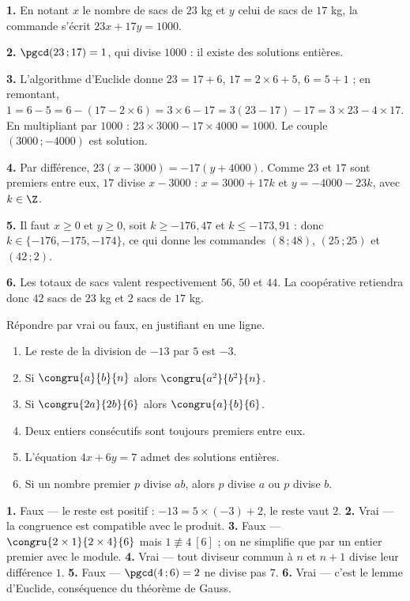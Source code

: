 \begin{corrige}
\textbf{1.} En notant $x$ le nombre de sacs de $23$ kg et $y$ celui de sacs de
$17$ kg, la commande s'écrit $23x+17y = 1000$.

\textbf{2.} $\pgcd(23\,;17) = 1$, qui divise $1000$ : il existe des solutions
entières.

\textbf{3.} L'algorithme d'Euclide donne $23 = 17+6$, $17 = 2\times6+5$,
$6 = 5+1$ ; en remontant, $1 = 6-5 = 6-(17-2\times6) = 3\times6-17
= 3(23-17)-17 = 3\times23-4\times17$. En multipliant par $1000$ :
$23\times3000-17\times4000 = 1000$. Le couple $(3000\,;-4000)$ est solution.

\textbf{4.} Par différence, $23(x-3000) = -17(y+4000)$. Comme $23$ et $17$
sont premiers entre eux, $17$ divise $x-3000$ : $x = 3000+17k$ et
$y = -4000-23k$, avec $k \in \Z$.

\textbf{5.} Il faut $x \geq 0$ et $y \geq 0$, soit
$k \geq -176{,}47$ et $k \leq -173{,}91$ : donc $k \in \{-176,-175,-174\}$,
ce qui donne les commandes $(8\,;48)$, $(25\,;25)$ et $(42\,;2)$.

\textbf{6.} Les totaux de sacs valent respectivement $56$, $50$ et $44$. La
coopérative retiendra donc $42$ sacs de $23$ kg et $2$ sacs de $17$ kg.
\end{corrige}

\begin{jemeteste}
Répondre par vrai ou faux, en justifiant en une ligne.

\begin{enumerate}[label=\textbf{\arabic*.}, leftmargin=*, itemsep=0.28em]
  \item Le reste de la division de $-13$ par $5$ est $-3$.
  \item Si $\congru{a}{b}{n}$ alors $\congru{a^{2}}{b^{2}}{n}$.
  \item Si $\congru{2a}{2b}{6}$ alors $\congru{a}{b}{6}$.
  \item Deux entiers consécutifs sont toujours premiers entre eux.
  \item L'équation $4x+6y = 7$ admet des solutions entières.
  \item Si un nombre premier $p$ divise $ab$, alors $p$ divise $a$ ou $p$
        divise $b$.
\end{enumerate}
\end{jemeteste}

\begin{corrige}[je me teste]
\textbf{1.} Faux — le reste est positif : $-13 = 5\times(-3)+2$, le reste vaut
$2$.
\textbf{2.} Vrai — la congruence est compatible avec le produit.
\textbf{3.} Faux — $\congru{2\times1}{2\times4}{6}$ mais
$1 \not\equiv 4 \ [6]$ ; on ne simplifie que par un entier premier avec le
module.
\textbf{4.} Vrai — tout diviseur commun à $n$ et $n+1$ divise leur différence
$1$.
\textbf{5.} Faux — $\pgcd(4\,;6) = 2$ ne divise pas $7$.
\textbf{6.} Vrai — c'est le lemme d'Euclide, conséquence du théorème de Gauss.
\end{corrige}


